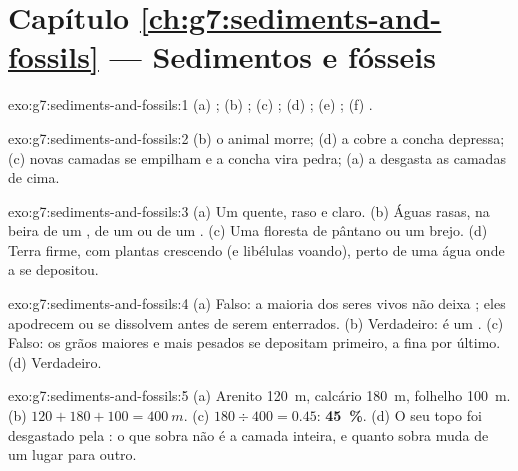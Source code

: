 \section*{Capítulo \ref{ch:g7:sediments-and-fossils} --- Sedimentos e fósseis}

\begin{solution}{exo:g7:sediments-and-fossils:1}
(a) ; (b) ; (c) ; (d) ; (e) ;
(f) .
\end{solution}

\begin{solution}{exo:g7:sediments-and-fossils:2}
(b) o animal morre; (d) a  cobre a concha depressa; (c) novas camadas
se empilham e a concha vira pedra; (a) a  desgasta as camadas de
cima.
\end{solution}

\begin{solution}{exo:g7:sediments-and-fossils:3}
(a) Um  quente, raso e claro. (b) Águas rasas, na beira de um , de
um  ou de um . (c) Uma floresta de pântano ou um brejo. (d) Terra
firme, com plantas crescendo (e libélulas voando), perto de uma água onde
a  se depositou.
\end{solution}

\begin{solution}{exo:g7:sediments-and-fossils:4}
(a) Falso: a maioria dos seres vivos não deixa ; eles apodrecem ou
se dissolvem antes de serem enterrados. (b) Verdadeiro: é um .
(c) Falso: os grãos maiores e mais pesados se depositam primeiro, a 
fina por último. (d) Verdadeiro.
\end{solution}

\begin{solution}{exo:g7:sediments-and-fossils:5}
(a) Arenito \qty{120}{m}, calcário \qty{180}{m}, folhelho \qty{100}{m}.
(b) $120 + 180 + 100 = \qty{400}{m}$. (c) $180 \div 400 = 0.45$:
\textbf{45~\%}. (d) O seu topo foi desgastado pela : o que sobra
não é a camada inteira, e quanto sobra muda de um lugar para outro.
\end{solution}

